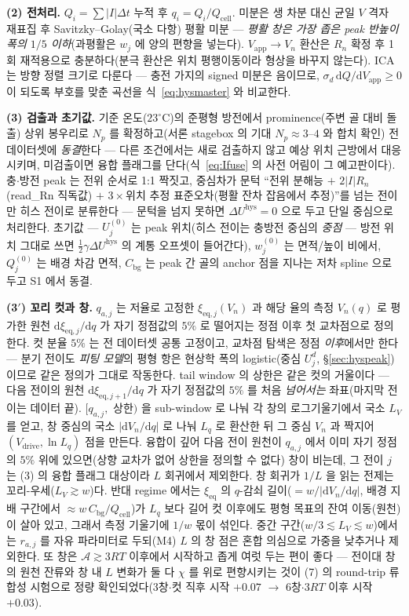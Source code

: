 \documentclass[11pt,a4paper]{article}
\newcommand{\dd}{\mathrm{d}}
\newcommand{\eq}{\mathrm{eq}}
\newcommand{\app}{\mathrm{app}}
\newcommand{\drive}{\mathrm{drive}}
\newcommand{\cell}{\mathrm{cell}}
\newcommand{\bg}{\mathrm{bg}}
\newcommand{\hys}{\mathrm{hys}}
\begin{document}
\textbf{(2) 전처리.} $Q_i=\sum|I|\Delta t$ 누적 후 $q_i=Q_i/Q_\cell$. 미분은 생 차분 대신 균일 $V$
격자 재표집 후 Savitzky--Golay(국소 다항) 평활 미분 — \emph{평활 창은 가장 좁은 peak 반높이 폭의 $1/5$
이하}(과평활은 $w_j$ 에 양의 편향을 넣는다). $V_\app\to V_n$ 환산은 $R_n$ 확정 후 1회 재적용으로 충분하다(분극
환산은 위치 평행이동이라 형상을 바꾸지 않는다). ICA 는 방향 정렬 크기로 다룬다 — 충전 가지의 signed
미분은 음이므로, $\sigma_d\,\dd Q/\dd V_\app\ge0$ 이 되도록 부호를 맞춘 곡선을
식~\eqref{eq:hysmaster} 와 비교한다.

\textbf{(3) 검출과 초기값.} 기준 온도($23^\circ$C)의 준평형 방전에서 prominence(주변 골 대비 돌출) 상위 봉우리로
$N_p$ 를 확정하고(서론 stagebox 의 기대 $N_p\approx3$--$4$ 와 합치 확인) 전 데이터셋에
\emph{동결}한다 — 다른 조건에서는 새로 검출하지 않고 예상 위치 근방에서
대응시키며, 미검출이면 융합 플래그를 단다(식~\eqref{eq:Ifuse} 의 사전 어림이 그 예고판이다). 충$\cdot$방전 peak 는 전위 순서로 1:1 짝짓고, 중심차가 문턱 ``전위 분해능 $+$ $2|I|R_n$(read\_Rn
직독값) $+$ $3\times$위치 추정 표준오차(평활 잔차 잡음에서 추정)''를 넘는 전이만 히스 전이로 분류한다 — 문턱을
넘지 못하면 $\Delta U^\hys=0$ 으로 두고 단일 중심으로 처리한다. 초기값 — $U_j^{(0)}$ 는 peak 위치(히스 전이는
충방전 중심의 \emph{중점} — 방전 위치 그대로 쓰면 $\tfrac12\gamma\Delta U^\hys$ 의 계통 오프셋이
들어간다), $w_j^{(0)}$ 는 면적/높이 비에서, $Q_j^{(0)}$ 는 배경 차감 면적, $C_\bg$ 는 peak 간 골의
anchor 점을 지나는 저차 spline 으로 두고 S1 에서 동결.

\textbf{(3$'$) 꼬리 컷과 창.} $q_{a,j}$ 는 저율로 고정한 $\xi_{\eq,j}(V_n)$ 과 해당 율의 측정
$V_n(q)$ 로 평가한 원천 $\dd\xi_{\eq,j}/\dd q$ 가 자기 정점값의 $5\%$ 로 떨어지는 정점 이후 첫
교차점으로 정의한다. 컷 분율 $5\%$ 는 전 데이터셋 공통 고정이고, 교차점 탐색은 정점 \emph{이후}에서만
한다 — 분기 전이도 \emph{피팅 모델}의 평형 항은 현상학 폭의 logistic(중심 $U_j^d$,
\S\ref{sec:hyspeak})이므로 같은 정의가 그대로 작동한다.
tail window 의 상한은 같은 컷의 거울이다 — 다음 전이의 원천 $\dd\xi_{\eq,j+1}/\dd q$ 가 자기 정점값의
$5\%$ 를 처음 \emph{넘어서는} 좌표(마지막 전이는 데이터 끝). $[q_{a,j},$ 상한$)$ 을 sub-window 로
나눠 각 창의 로그기울기에서 국소 $L_V$ 를 얻고, 창 중심의 국소 $|\dd V_n/\dd q|$ 로 나눠 $L_q$ 로
환산한 뒤 그 중심 $V_n$ 과 짝지어 $(V_\drive,\ln L_q)$ 점을 만든다. 융합이 깊어 다음 전이 원천이 $q_{a,j}$ 에서 이미 자기 정점의 $5\%$ 위에 있으면(상향
교차가 없어 상한을 정의할 수 없다) 창이 비는데, 그 전이 $j$ 는 (3) 의 융합 플래그 대상이라 $L$
회귀에서 제외한다. 창 회귀가 $1/L$ 을 읽는 전제는 꼬리-우세($L_V\gtrsim w$)다. 반대 regime 에서는 $\xi_{\eq}$ 의
$q$-감쇠 길이($=w/|\dd V_n/\dd q|$, 배경 지배 구간에서 $\approx w\,C_\bg/Q_\cell$)가 $L_q$ 보다
길어 컷 이후에도 평형 목표의 잔여 이동(원천)이 살아 있고, 그래서 측정 기울기에 $1/w$ 몫이 섞인다. 중간 구간($w/3\lesssim L_V\lesssim w$)에서는 $r_{a,j}$ 를 자유
파라미터로 두되(M4) $L$ 의 창 점은 혼합 의심으로 가중을 낮추거나 제외한다. 또 창은
$\mathcal A\gtrsim3RT$ 이후에서 시작하고 좁게 여럿 두는 편이 좋다 — 전이대 창의 원천 잔류와 창 내
$L$ 변화가 둘 다 $\chi$ 를 위로 편향시키는 것이 (7) 의 round-trip 류 합성 시험으로 정량
확인되었다(3창$\cdot$컷 직후 시작 $+0.07$ $\to$ 6창$\cdot$$3RT$ 이후 시작 $+0.03$).
\end{document}
